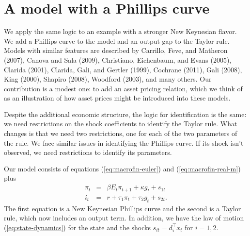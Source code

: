 \documentclass[11pt]{article}
\begin{document}
{\section{A model with a Phillips curve}
\label{sec:phillips-curve}

We apply the same logic to an example with a stronger
New Keynesian flavor.
We add a Phillips curve to the model and an output gap to the Taylor rule.
Models with similar features are described by
Carrillo, Feve, and Matheron (2007),
Canova and Sala (2009),
Christiano, Eichenbaum, and Evans (2005),
Clarida (2001), 
Clarida, Gali, and Gertler (1999),
Cochrane (2011), 
Gali (2008),
King (2000),
Shapiro (2008),
Woodford (2003), and many others.
Our contribution is a modest one:
to add an asset pricing relation,
which we think of as an illustration of how asset prices
might be introduced into these models.

Despite the additional economic structure,
the logic for identification is the same:
we need restrictions on the shock coefficients
to identify the Taylor rule.
What changes is that we need two restrictions,
one for each of the two parameters of the rule.
We face similar issues in identifying the Phillips curve.
If its shock isn't observed,
we need restrictions to identify its parameters.


Our model consists of equations (\ref{eq:macrofin-euler})
and (\ref{eq:macrofin-real-m}) plus
\begin{eqnarray*}
        \pi_t &=&  \beta E_t \pi_{t+1} + \kappa g_t + s_{1t} \\
    i_t &=& r + \tau_1 \pi_t + \tau_2 g_t + s_{2t}.
\end{eqnarray*}
The first equation is a New Keynesian Phillips curve and
the second is a Taylor rule, which now includes an output term.
In addition, we have
the law of motion (\ref{eq:state-dynamics}) for the state
and the shocks $s_{it} = d_i^\top x_t$ for $i=1,2$.

}
\end{document}
